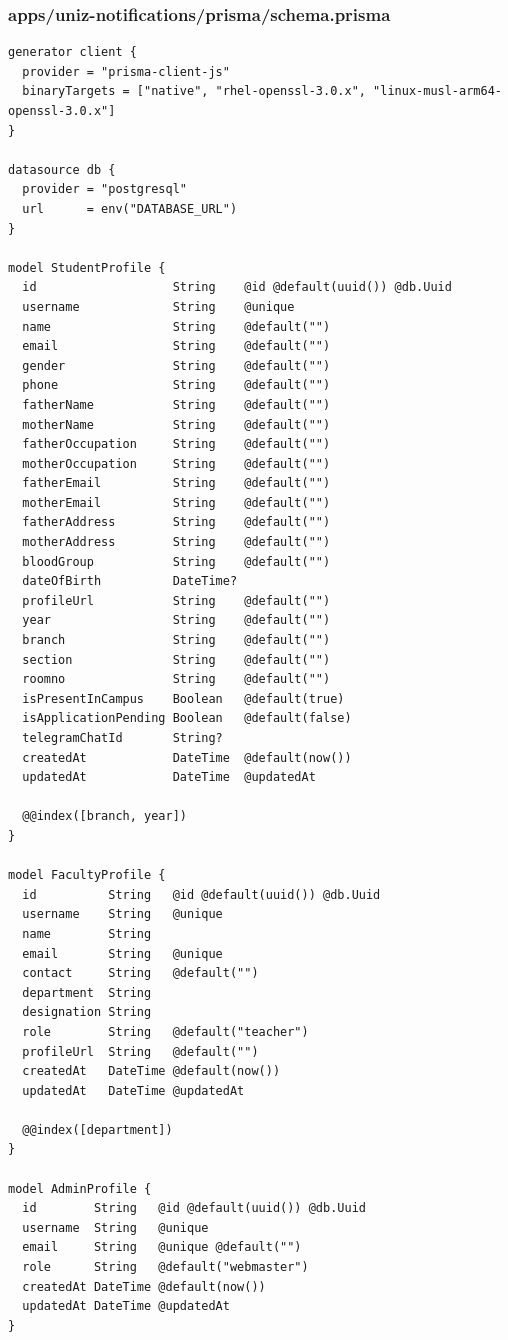 \documentclass[11pt,a4paper,oneside]{article}
\begin{document}
\subsubsection*{apps/uniz-notifications/prisma/schema.prisma}
\begin{lstlisting}
generator client {
  provider = "prisma-client-js"
  binaryTargets = ["native", "rhel-openssl-3.0.x", "linux-musl-arm64-openssl-3.0.x"]
}

datasource db {
  provider = "postgresql"
  url      = env("DATABASE_URL")
}

model StudentProfile {
  id                   String    @id @default(uuid()) @db.Uuid
  username             String    @unique
  name                 String    @default("")
  email                String    @default("")
  gender               String    @default("")
  phone                String    @default("")
  fatherName           String    @default("")
  motherName           String    @default("")
  fatherOccupation     String    @default("")
  motherOccupation     String    @default("")
  fatherEmail          String    @default("")
  motherEmail          String    @default("")
  fatherAddress        String    @default("")
  motherAddress        String    @default("")
  bloodGroup           String    @default("")
  dateOfBirth          DateTime?
  profileUrl           String    @default("")
  year                 String    @default("")
  branch               String    @default("")
  section              String    @default("")
  roomno               String    @default("")
  isPresentInCampus    Boolean   @default(true)
  isApplicationPending Boolean   @default(false)
  telegramChatId       String?
  createdAt            DateTime  @default(now())
  updatedAt            DateTime  @updatedAt

  @@index([branch, year])
}

model FacultyProfile {
  id          String   @id @default(uuid()) @db.Uuid
  username    String   @unique
  name        String
  email       String   @unique
  contact     String   @default("")
  department  String
  designation String
  role        String   @default("teacher")
  profileUrl  String   @default("")
  createdAt   DateTime @default(now())
  updatedAt   DateTime @updatedAt

  @@index([department])
}

model AdminProfile {
  id        String   @id @default(uuid()) @db.Uuid
  username  String   @unique
  email     String   @unique @default("")
  role      String   @default("webmaster")
  createdAt DateTime @default(now())
  updatedAt DateTime @updatedAt
}


\end{lstlisting}
\end{document}
